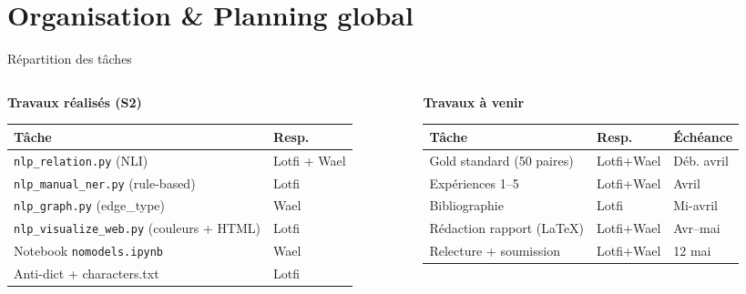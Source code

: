 \documentclass[aspectratio=169]{beamer}
\begin{document}
\section{Organisation \& Planning global}

\begin{frame}{Répartition des tâches}
  \begin{columns}[T]
    \begin{column}{0.48\textwidth}
      \textbf{Travaux réalisés (S2)}\\[4pt]
      \footnotesize
      \setlength{\tabcolsep}{3pt}
      \renewcommand{\arraystretch}{1.25}
      \begin{tabular}{p{4.0cm} p{2.0cm}}
        \toprule
        \textbf{Tâche} & \textbf{Resp.} \\
        \midrule
        \texttt{nlp\_relation.py} (NLI) & Lotfi + Wael \\
        \texttt{nlp\_manual\_ner.py} (rule-based) & Lotfi \\
        \texttt{nlp\_graph.py} (edge\_type) & Wael \\
        \texttt{nlp\_visualize\_web.py} (couleurs + HTML) & Lotfi \\
        Notebook \texttt{nomodels.ipynb} & Wael \\
        Anti-dict + characters.txt & Lotfi \\
        \bottomrule
      \end{tabular}
    \end{column}
    \begin{column}{0.48\textwidth}
      \textbf{Travaux à venir}\\[4pt]
      \footnotesize
      \setlength{\tabcolsep}{3pt}
      \renewcommand{\arraystretch}{1.25}
      \begin{tabular}{p{3.6cm} p{1.5cm} p{1.2cm}}
        \toprule
        \textbf{Tâche} & \textbf{Resp.} & \textbf{Échéance} \\
        \midrule
        Gold standard (50 paires)   & Lotfi+Wael & Déb. avril \\
        Expériences 1--5            & Lotfi+Wael & Avril \\
        Bibliographie               & Lotfi      & Mi-avril \\
        Rédaction rapport (\LaTeX)  & Lotfi+Wael & Avr--mai \\
        Relecture + soumission      & Lotfi+Wael & 12 mai \\
        \bottomrule
      \end{tabular}
    \end{column}
  \end{columns}
\end{frame}
\end{document}
